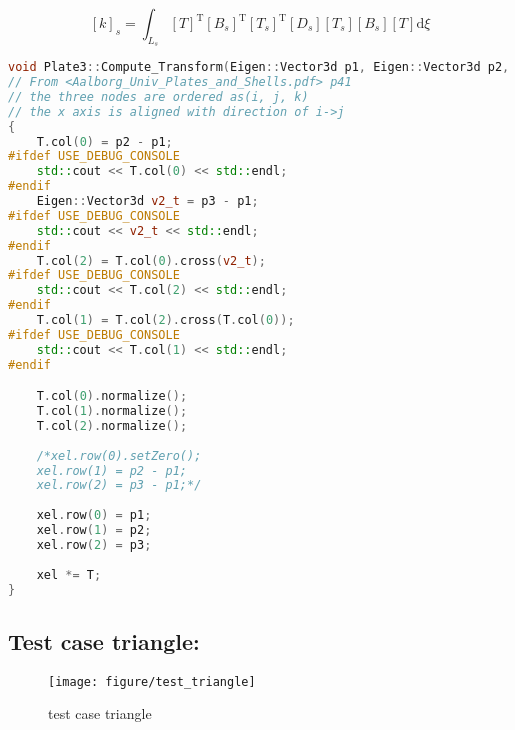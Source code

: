 \begin{equation}\label{key}
[k]_s = \int_{L_s} [T]^\mathrm{T} [B_s]^\mathrm{T}[T_s]^\mathrm{T}[D_s][T_s][B_s][T] \mathrm{d} \xi
\end{equation}

\begin{lstlisting}[language=c++]
void Plate3::Compute_Transform(Eigen::Vector3d p1, Eigen::Vector3d p2, Eigen::Vector3d p3, Eigen::Matrix3d &T, Eigen::Matrix3d &xel)
// From <Aalborg_Univ_Plates_and_Shells.pdf> p41
// the three nodes are ordered as(i, j, k)
// the x axis is aligned with direction of i->j
{
	T.col(0) = p2 - p1;
#ifdef USE_DEBUG_CONSOLE
	std::cout << T.col(0) << std::endl;	
#endif
	Eigen::Vector3d v2_t = p3 - p1;
#ifdef USE_DEBUG_CONSOLE
	std::cout << v2_t << std::endl;
#endif
	T.col(2) = T.col(0).cross(v2_t);
#ifdef USE_DEBUG_CONSOLE
	std::cout << T.col(2) << std::endl;
#endif
	T.col(1) = T.col(2).cross(T.col(0));
#ifdef USE_DEBUG_CONSOLE
	std::cout << T.col(1) << std::endl;
#endif

	T.col(0).normalize();
	T.col(1).normalize();
	T.col(2).normalize();
	
	/*xel.row(0).setZero();
	xel.row(1) = p2 - p1;
	xel.row(2) = p3 - p1;*/
	
	xel.row(0) = p1;
	xel.row(1) = p2;
	xel.row(2) = p3;
	
	xel *= T;
}
\end{lstlisting}

\subsection{Test case triangle:}
\begin{figure}[h!]
\centering
\texttt{[image: figure/test\_triangle]}
\caption{test case triangle}
\label{fig:testtriangle}
\end{figure}



